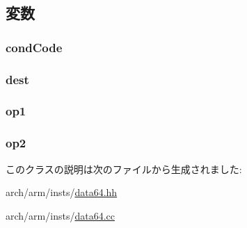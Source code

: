 \subsection{変数}
\hypertarget{classArmISA_1_1DataXCondSelOp_a273dc0fe84de8f4a9cf52aaf8dc27885}{
\subsubsection[{condCode}]{ {\bf condCode}}}
\label{classArmISA_1_1DataXCondSelOp_a273dc0fe84de8f4a9cf52aaf8dc27885}
\hypertarget{classArmISA_1_1DataXCondSelOp_aec72e8e45bdc87abeeeb75d2a8a9a716}{
\subsubsection[{dest}]{ {\bf dest}}}
\label{classArmISA_1_1DataXCondSelOp_aec72e8e45bdc87abeeeb75d2a8a9a716}
\hypertarget{classArmISA_1_1DataXCondSelOp_a4c465c43ad568f8bcf8ae71480e9cfea}{
\subsubsection[{op1}]{ {\bf op1}}}
\label{classArmISA_1_1DataXCondSelOp_a4c465c43ad568f8bcf8ae71480e9cfea}
\hypertarget{classArmISA_1_1DataXCondSelOp_a7799ff6cbe5a252199059eb8665820e7}{
\subsubsection[{op2}]{ {\bf op2}}}
\label{classArmISA_1_1DataXCondSelOp_a7799ff6cbe5a252199059eb8665820e7}


このクラスの説明は次のファイルから生成されました:\begin{DoxyCompactItemize}
\item 
arch/arm/insts/\hyperlink{data64_8hh}{data64.hh}\item 
arch/arm/insts/\hyperlink{data64_8cc}{data64.cc}\end{DoxyCompactItemize}
